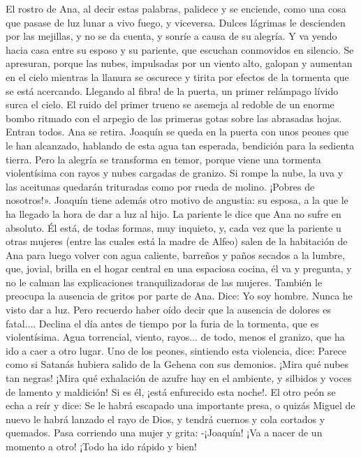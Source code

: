\documentclass[12pt]{book} %
\begin{document}
El rostro de Ana, al decir estas palabras, palidece y se enciende, como una cosa que pasase de luz lunar a vivo fuego, y 
viceversa. Dulces lágrimas le descienden por las mejillas, y no se da cuenta, y sonríe a causa de su alegría. Y va yendo hacia casa entre su esposo y su pariente, que escuchan conmovidos en silencio. 
Se apresuran, porque las nubes, impulsadas por un viento alto, galopan y aumentan en el cielo mientras la llanura se 
oscurece y tirita por efectos de la tormenta que se está acercando. Llegando al fibra! de la puerta, un primer relámpago lívido surca el cielo. El ruido del primer trueno se asemeja al redoble de un enorme bombo ritmado con el arpegio de las primeras gotas sobre las abrasadas hojas. 
Entran todos. Ana se retira. Joaquín se queda en la puerta con unos peones que le han alcanzado, hablando de esta agua tan esperada, bendición para la sedienta tierra. Pero la alegría se transforma en temor, porque viene una tormenta violentísima con rayos y nubes cargadas de granizo. 
Si rompe la nube, la uva y las aceitunas quedarán trituradas como por rueda de molino. ¡Pobres de nosotros!». 
Joaquín tiene además otro motivo de angustia: su esposa, a la que le ha llegado la hora de dar a luz al hijo. La pariente 
le dice que Ana no sufre en absoluto. Él está, de todas formas, muy inquieto, y, cada vez que la pariente u otras mujeres (entre las cuales está la madre de Alfeo) salen de la habitación de Ana para luego volver con agua caliente, barreños y paños secados a la lumbre, que, jovial, brilla en el hogar central en una espaciosa cocina, él va y pregunta, y no le calman las explicaciones tranquilizadoras de las mujeres. También le preocupa la ausencia de gritos por parte de Ana. Dice: 
Yo soy hombre. Nunca he visto dar a luz. Pero recuerdo haber oído decir que la ausencia de dolores es fatal.... 
Declina el día antes de tiempo por la furia de la tormenta, que es violentísima. Agua torrencial, viento, rayos... de todo, 
menos el granizo, que ha ido a caer a otro lugar. 
Uno de los peones, sintiendo esta violencia, dice: 
Parece como si Satanás hubiera salido de la Gehena con sus demonios. ¡Mira qué nubes tan negras! ¡Mira qué 
exhalación de azufre hay en el ambiente, y silbidos y voces de lamento y maldición! Si es él, ¡está enfurecido esta noche!. 
El otro peón se echa a reír y dice: 
Se le habrá escapado una importante presa, o quizás Miguel de nuevo le habrá lanzado el rayo de Dios, y tendrá cuernos y cola cortados y quemados. 
Pasa corriendo una mujer y grita: 
-¡Joaquín! ¡Va a nacer de un momento a otro! ¡Todo ha ido rápido y bien! 
\end{document}
